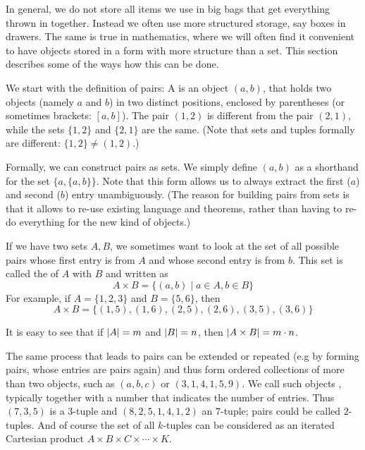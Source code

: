 In general, we do not store all items we use in big bags that get everything
thrown in together. Instead we often use more structured storage, say boxes
in drawers.
The same is true in mathematics,
where we will often find it convenient to have objects stored in a form with
more structure than a set. This section describes some of the ways how this
can be done.

We start with the definition of pairs: A  is an object $(a,b)$,
that holds two objects (namely $a$ and $b$) in two distinct positions,
enclosed by parentheses (or sometimes brackets: $[a,b]$). The
pair $(1,2)$ is different from the pair $(2,1)$, while the sets $\{1,2\}$
and $\{2,1\}$ are the same. (Note that sets and tuples formally are
different: $\{1,2\}\not=(1,2)$.)

Formally, we can construct pairs as sets. We simply define $(a,b)$ as a
shorthand for the set $\{a,\{a,b\}\}$. Note that this form allows us to
always extract the first ($a$) and second ($b$) entry unambiguously. (The
reason for building pairs from sets is that it allows to re-use existing
language and theorems, rather than having to re-do everything for the new
kind of objects.)
\medskip

If we have two sets $A,B$, we sometimes want to look at the set of all
possible pairs whose first entry is from $A$ and whose second entry is from
$b$.
This set is called the 
of $A$ with
$B$ and written as
\[
A\times B=\{(a,b)\mid a\in A,b\in B\}
\]
For example, if $A=\{1,2,3\}$ and $B=\{5,6\}$, then
\[
A\times B=\{(1,5),(1,6),(2,5),(2,6),(3,5),(3,6)\}
\]

It is easy to see that if $\left|A\right|=m$ and $\left|B\right|=n$, then $\left|A\times
B\right|=m\cdot n$.
\medskip

The same process that leads to pairs can be extended or repeated (e.g by
forming pairs, whose entries are pairs again) and thus form ordered
collections of more than two objects, such as $(a,b,c)$ or $(3,1,4,1,5,9)$.
We call such objects ,
typically together with a number that
indicates the number of entries.
Thus $(7,3,5)$ is a $3$-tuple and $(8,2,5,1,4,1,2)$ an $7$-tuple; pairs
could be called $2$-tuples. 
And of course the set of all $k$-tuples can be considered as an iterated
Cartesian product $A\times B\times C\times\cdots\times K$.
\medskip

